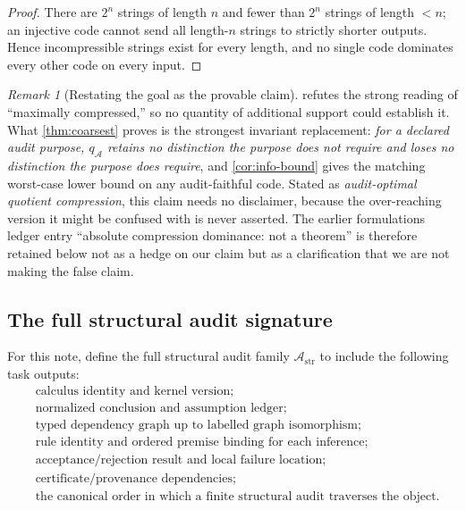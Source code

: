 \documentclass[11pt]{article}
\newcommand{\qA}{q_{\mathcal A}}
\newcommand{\mcA}{\mathcal A}
\theoremstyle{plain}
\theoremstyle{definition}
\theoremstyle{remark}
\newtheorem{remark}[theorem]{Remark}
\begin{document}
\begin{proof}
There are $2^n$ strings of length $n$ and fewer than $2^n$ strings of length $<n$; an injective code cannot send all length-$n$ strings to strictly shorter outputs.  Hence incompressible strings exist for every length, and no single code dominates every other code on every input.
\end{proof}

\begin{remark}[Restating the goal as the provable claim]
\label{rem:compression-meaning}
 refutes the strong reading of ``maximally compressed,'' so no quantity of additional support could establish it.  What \cref{thm:coarsest} proves is the strongest invariant replacement: \emph{for a declared audit purpose, $\qA$ retains no distinction the purpose does not require and loses no distinction the purpose does require}, and \cref{cor:info-bound} gives the matching worst-case lower bound on any audit-faithful code.  Stated as \emph{audit-optimal quotient compression}, this claim needs no disclaimer, because the over-reaching version it might be confused with is never asserted.  The earlier formulations ledger entry ``absolute compression dominance: not a theorem'' is therefore retained below not as a hedge on our claim but as a clarification that we are not making the false claim.
\end{remark}

\subsection{The full structural audit signature}

For this note, define the full structural audit family $\mcA_{\mathrm{str}}$ to include the following task outputs:
\[
\begin{aligned}
  &\text{calculus identity and kernel version};\\
  &\text{normalized conclusion and assumption ledger};\\
  &\text{typed dependency graph up to labelled graph isomorphism};\\
  &\text{rule identity and ordered premise binding for each inference};\\
  &\text{acceptance/rejection result and local failure location};\\
  &\text{certificate/provenance dependencies};\\
  &\text{the canonical order in which a finite structural audit traverses the object}.
\end{aligned}
\]
\end{document}

